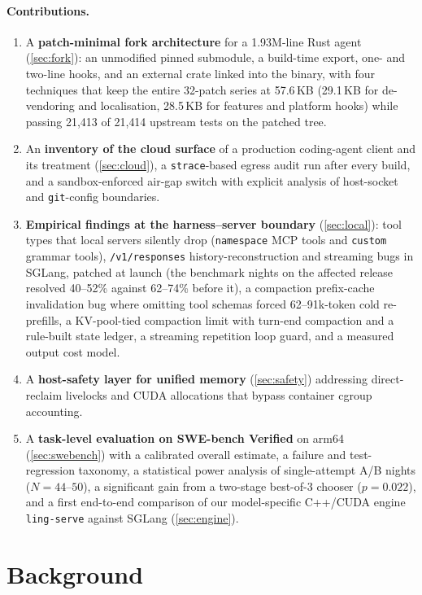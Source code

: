 \documentclass[11pt]{article}
\newcommand{\code}[1]{\texttt{#1}}
\begin{document}
\paragraph{Contributions.}
\begin{enumerate}
\item A \textbf{patch-minimal fork architecture} for a 1.93M-line Rust agent (\cref{sec:fork}): an
unmodified pinned submodule, a build-time export, one- and two-line hooks, and an external crate
linked into the binary, with four techniques that keep the entire 32-patch series at 57.6\,KB
(29.1\,KB for de-vendoring and localisation, 28.5\,KB for features and platform hooks) while passing
21{,}413 of 21{,}414 upstream tests on the patched tree.
\item An \textbf{inventory of the cloud surface} of a production coding-agent client and its
treatment (\cref{sec:cloud}), a \code{strace}-based egress audit run after every build, and a
sandbox-enforced air-gap switch with explicit analysis of host-socket and \code{git}-config
boundaries.
\item \textbf{Empirical findings at the harness--server boundary} (\cref{sec:local}): tool types
that local servers silently drop (\code{namespace} MCP tools and \code{custom} grammar tools),
\code{/v1/responses} history-reconstruction and streaming bugs in SGLang, patched at launch (the
benchmark nights on the affected release resolved 40--52\% against 62--74\% before it), a compaction prefix-cache invalidation bug
where omitting tool schemas forced 62--91k-token cold re-prefills, a KV-pool-tied compaction limit
with turn-end compaction and a rule-built state ledger, a streaming repetition loop guard, and a
measured output cost model.
\item A \textbf{host-safety layer for unified memory} (\cref{sec:safety}) addressing direct-reclaim
livelocks and CUDA allocations that bypass container cgroup accounting.
\item A \textbf{task-level evaluation on SWE-bench Verified} on arm64 (\cref{sec:swebench}) with a
calibrated overall estimate, a failure and test-regression taxonomy, a statistical power analysis
of single-attempt A/B nights ($N=44$--$50$), a significant gain from a two-stage best-of-3 chooser
($p = 0.022$), and a first end-to-end comparison of our model-specific C++/CUDA engine
\code{ling-serve} against SGLang (\cref{sec:engine}).
\end{enumerate}

\section{Background}
\end{document}
